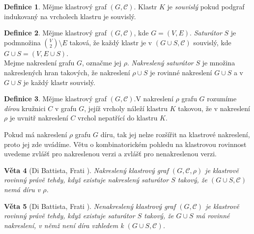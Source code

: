 \documentclass[12pt,a4report]{report}
\newtheorem{theorem}{Věta}[chapter]
\theoremstyle{definition}
\newtheorem{defn}[theorem]{Definice}
\begin{document}
\begin{defn}
Mějme klastrový graf $(G,\mathcal C)$. Klastr $K$ je \textit{souvislý} pokud podgraf indukovaný na vrcholech klastru je souvislý. 
\end{defn}

\begin{defn}
Mějme klastrový graf $(G,\mathcal C)$, kde $G=(V,E)$. \textit{Saturátor} $S$ je podmnožina ${V \choose 2} \setminus E$ taková, že každý klastr je v $(G \cup S,\mathcal C)$ souvislý, kde $G \cup S = (V,E \cup S)$. \\
Mejme nakreslení grafu $G$, označme jej $\rho$. \textit{Nakreslený saturátor} $S$ je množina nakreslených hran takových, že nakreslení $\rho \cup S$ je rovinné nakreslení $G \cup S$ a v $G \cup S$ je každý klastr souvislý. 
\end{defn}

\begin{defn}
Mějme klastrový graf $(G,\mathcal C)$.V nakreslení $\rho$ grafu $G$ rozumíme \textit{dírou} kružnici $C$ v grafu $G$, jejíž vrcholy náleží klastru $K$ takovou, že v nakreslení $\rho$  je uvnitř nakreslení $C$ vrchol nepatřící do klastru $K$.
\end{defn}

Pokud má nakreslení $\rho$ grafu $G$ díru, tak jej nelze rozšířit na klastrové nakreslení, proto jej zde uvádíme.
Větu o kombinatorickém pohledu na klastrovou rovinnost uvedeme zvlášť pro nakreslenou verzi a zvlášť pro nenakreslenou verzi.

\begin{theorem}[Di Battista, Frati \cite{DiBattistaFrati07}]
Nakreslený klastrový graf $(G,\mathcal C, \rho)$ je klastrově rovinný právě tehdy, když existuje nakreslený saturátor $S$ takový, že $(G \cup S,\mathcal C)$ nemá díru v $\rho$.
\end{theorem}

\begin{theorem}[Di Battista, Frati \cite{DiBattistaFrati07}]
Nenakreslený klastrový graf $(G,\mathcal C)$ je klastrově rovinný právě tehdy, když existuje saturátor $S$ takový, že $G \cup S$ má rovinné nakreslení, v němž není díra vzhledem k $(G \cup S,\mathcal C)$.
\end{theorem}
\end{document}
